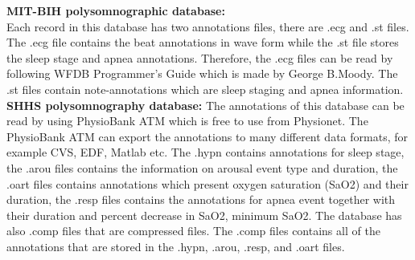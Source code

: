         \textbf{MIT-BIH polysomnographic database: }\\
        Each record in this database has two annotations files, there are .ecg and .st files. The .ecg file contains the beat annotations in wave form while the .st file stores the sleep stage and apnea annotations. Therefore, the .ecg files can be read by following WFDB Programmer's Guide which is made by George B.Moody\citep{MIT_BIH_WFDB}. The .st files contain note-annotations which are sleep staging and apnea information.\\
        \textbf{SHHS polysomnography database: }
        The annotations of this database can be read by using PhysioBank ATM\citep{SHSH_Physiobank} which is free to use from Physionet. The PhysioBank ATM can export the annotations to many different data formats, for example CVS, EDF, Matlab etc. The .hypn contains annotations for sleep stage, the .arou files contains the information on arousal event type and duration, the .oart files contains annotations which present oxygen saturation (SaO2) and their duration, the .resp files contains the annotations for apnea event together with their duration and percent decrease in SaO2, minimum SaO2. The database has also .comp files that are compressed files. The .comp files contains all of the annotations that are stored in the .hypn, .arou, .resp, and .oart files.
